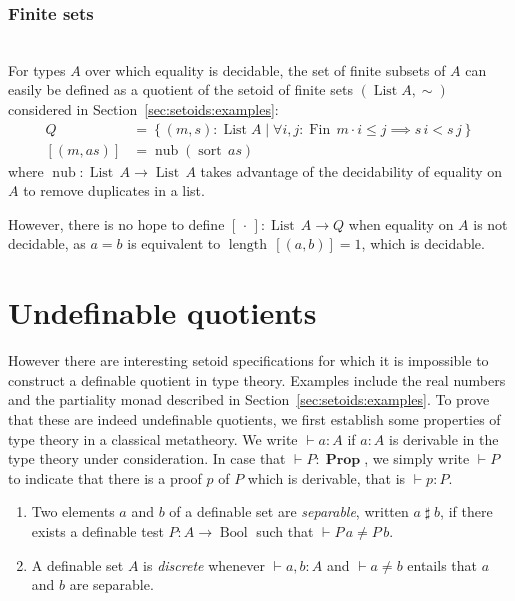 \documentclass[envcountsame]{llncs}
\newcommand{\dotph}{\,\cdot\,} %
\providecommand{\class}[1]{[#1]}
\providecommand{\set}  [1]{\left\{#1\right\}}
\DeclareMathOperator{\Prop}{\mathbf{Prop}}
\DeclareMathOperator{\Bool}{Bool}
\DeclareMathOperator{\List}{List}
\DeclareMathOperator{\Fin}{Fin}
\DeclareMathOperator{\sort}{sort}
\DeclareMathOperator{\length}{length}
\DeclareMathOperator{\nub}{nub}
\newcommand{\sep}{\mathrel{\sharp}}
\begin{document}
\subsubsection*{Finite sets}\hfill\\

For types $A$ over which equality is decidable,  the set of finite subsets of $A$ can easily be defined as a quotient of the setoid of finite sets $(\List A, \sim)$ considered in Section~\ref{sec:setoids:examples}:
\begin{align*}
Q &= \set{(m , s) : \List A\mid  \forall i,j:\Fin\,m \cdot i\leq j\implies s\,i < s\,j}\\
\class{(m,as)} &=\nub(\sort\,as)
\end{align*}
where $\nub:\List\,A\to\List\,A$ takes advantage of the decidability of equality on $A$ to remove duplicates in a list.

However, there is no hope to define   $\class\dotph : \List\,A \to Q$ when equality on $A$ is not decidable, as  $a=b$ is equivalent to $\length\,[(a,b)] = 1$, which is decidable.





\section{Undefinable quotients}
However there are interesting setoid specifications for which it is impossible to construct a definable quotient in type theory. Examples include the real numbers and the partiality monad described in Section~\ref{sec:setoids:examples}.
To prove that these are indeed undefinable quotients, we first establish some properties of type theory in a classical metatheory.
We write $\vdash a : A$ if $a : A$ is derivable in the type theory under consideration. In case that $\vdash P : \Prop$, we simply  write $\vdash P$ to indicate that there is a proof $p$ of $P$ which is derivable, that is $\vdash p : P$.
\begin{definition}\hfill
\begin{enumerate}
\item Two elements $a$ and $b$ of a definable set are \emph{separable}, written $a \sep b$, if there exists a definable test $P\colon A\to \Bool$ such that $\vdash P\,a \neq P\,b$.
\item A definable set $A$ is \emph{discrete} whenever $\vdash a, b :A$ and   $\vdash a\not= b$
entails that $a$ and $b$ are separable.
\end{enumerate}
\end{definition}
\end{document}
